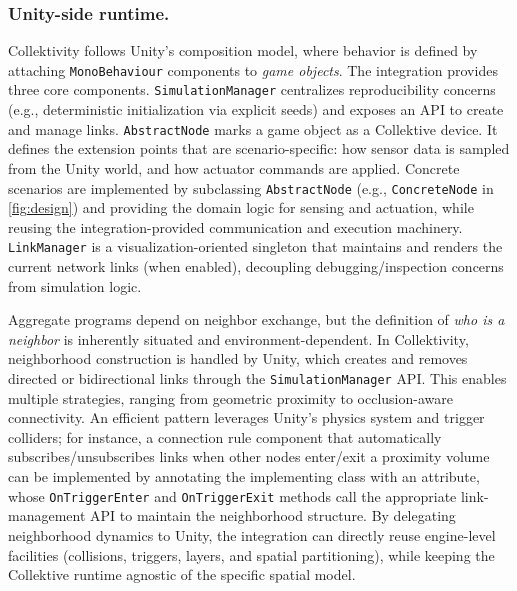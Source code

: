 \documentclass[runningheads]{llncs}
\begin{document}
\subsubsection{Unity-side runtime.}
Collektivity follows Unity's composition model, where behavior is defined by attaching \texttt{MonoBehaviour} components to \emph{game objects}.
The integration provides three core components.
%
\texttt{SimulationManager}
centralizes reproducibility concerns (e.g., deterministic initialization via explicit seeds) and exposes an API to create and manage links.
%
\texttt{AbstractNode} marks a game object as a Collektive device.
It defines the extension points that are scenario-specific:
how sensor data is sampled from the Unity world, and how actuator commands are applied.
%
Concrete scenarios are implemented by subclassing \texttt{AbstractNode} (e.g., \texttt{ConcreteNode} in \cref{fig:design}) and providing the
domain logic for sensing and actuation, while reusing the integration-provided communication and execution machinery.
%
\texttt{LinkManager} is a visualization-oriented singleton that maintains and renders the current network links (when enabled),
decoupling debugging/inspection concerns from simulation logic.

Aggregate programs depend on neighbor exchange, 
but the definition of \emph{who is a neighbor} is inherently situated and environment-dependent.
%
In Collektivity, 
neighborhood construction is handled by Unity, which creates and removes directed or bidirectional links through the
\texttt{SimulationManager} \ac{API}.
%
This enables multiple strategies, ranging from geometric proximity to occlusion-aware connectivity.
%
An efficient pattern leverages Unity's physics system and trigger colliders;
for instance, a connection rule component that automatically subscribes/unsubscribes links when other nodes enter/exit a proximity
volume can be implemented by annotating the implementing class with an attribute,
whose \texttt{OnTriggerEnter} and \texttt{OnTriggerExit} methods call the appropriate link-management \ac{API} to maintain the neighborhood structure.
%
%
%
%
%
By delegating neighborhood dynamics to Unity, the integration can directly reuse engine-level facilities (collisions, triggers, layers, and spatial
partitioning), while keeping the Collektive runtime agnostic of the specific spatial model.
\end{document}

